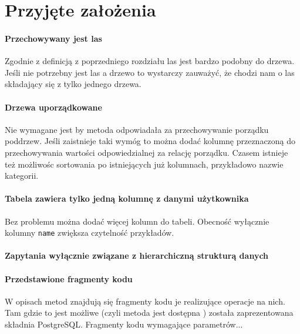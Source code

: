 \section{Przyjęte założenia}

\paragraph{Przechowywany jest las}
Zgodnie z definicją z poprzedniego rozdziału las jest bardzo podobny do drzewa.
Jeśli nie potrzebny jest las a drzewo to wystarczy zauważyć, że chodzi nam o las składający się z tylko jednego drzewa.


\paragraph{Drzewa uporządkowane}
Nie wymagane jest by metoda odpowiadała za przechowywanie porządku poddrzew.
Jeśli zaistnieje taki wymóg to można dodać kolumnę przeznaczoną do przechowywania wartości odpowiedzialnej za relację porządku.
Czasem istnieje też możliwośc sortowania po istniejących już kolumnach, przykładowo nazwie kategorii.


\paragraph{Tabela zawiera tylko jedną kolumnę z danymi użytkownika} 
Bez problemu można dodać więcej kolumn do tabeli. Obecność wyłącznie kolumny \texttt{name} zwiększa czytelność przykładów.



\paragraph{Zapytania wyłącznie związane z hierarchiczną strukturą danych}
\begin{itemize*}
    \item {}
    \item {}
    \item {}
    \item {}
    \item {}
\end{itemize*}




\paragraph{Przedstawione fragmenty kodu} 
W opisach metod znajdują się fragmenty kodu je realizujące operacje na nich. 
Tam gdzie to jest możliwe (czyli metoda jest dostępna ) została zaprezentowana składnia PostgreSQL.
Fragmenty kodu  wymagające parametrów...

